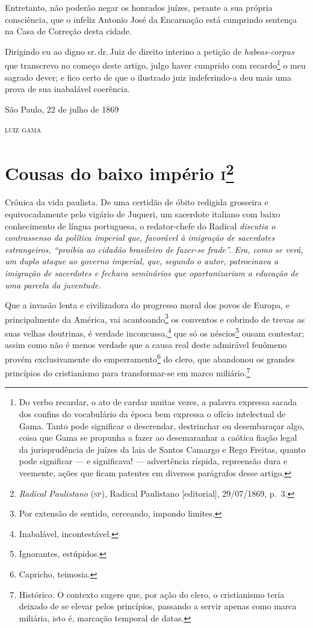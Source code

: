 Entretanto, não poderão negar os honrados juízes, perante a sua própria
consciência, que o infeliz Antonio José da Encarnação está cumprindo
sentença na Casa de Correção desta cidade.

Dirigindo eu ao digno sr.\,dr.\,Juiz de direito interino a petição de
\emph{habeas-corpus} que transcrevo no começo deste artigo, julgo haver
cumprido com recardo\footnote{Do verbo recardar, o ato de cardar
  muitas vezes, a palavra expressa sacada dos confins do vocabulário da
  época bem expressa o ofício intelectual de Gama. Tanto pode significar
  o deserendar, destrinchar ou desembaraçar algo, coisa que Gama se
  propunha a fazer ao desemaranhar a caótica fiação legal da
  jurisprudência de juízes da laia de Santos Camargo e Rego Freitas,
  quanto pode significar --- e significava! --- advertência ríspida,
  repreensão dura e veemente, ações que ficam patentes em diversos
  parágrafos desse artigo.} o meu sagrado dever; e fico certo de que o
ilustrado juiz indeferindo-a deu mais uma prova de sua inabalável
coerência.

\begin{flushright}
São Paulo, 22 de julho de 1869

\textsc{luiz gama}
\end{flushright}

\chapter{Cousas do baixo império \textsc{i}\footnote{\emph{Radical
  Paulistano} (\textsc{sp}), Radical Paulistano {[}editorial{]}, 29/07/1869,
  p.~3.}}

\begin{didascalia}
Crônica da vida paulista. De uma certidão de óbito redigida grosseira e
equivocadamente pelo vigário de Juqueri, um sacerdote italiano com baixo
conhecimento de língua portuguesa, o redator-chefe do Radical
\emph{discutia o contrassenso da política imperial que, favorável à
imigração de sacerdotes estrangeiros, ``proibia ao cidadão
brasileiro de fazer-se frade''. Era, como se verá, um duplo ataque ao
governo imperial, que, segundo o autor, patrocinava a imigração de
sacerdotes e fechava seminários que oportunizariam a educação de uma
parcela da juventude.}
\end{didascalia}



Que a invasão lenta e civilizadora do progresso moral dos povos de
Europa, e principalmente da América, vai acantoando\footnote{Por
  extensão de sentido, cerceando, impondo limites.} os conventos e
cobrindo de trevas as suas velhas doutrinas, é verdade
inconcussa,\footnote{Inabalável, incontestável.} que só os
néscios\footnote{Ignorantes, estúpidos.} ousam contestar; assim como
não é menos verdade que a causa real deste admirável fenômeno provém
exclusivamente do emperramento\footnote{Capricho, teimosia.} do clero,
que abandonou os grandes princípios do cristianismo para transformar-se
em marco miliário.\footnote{Histórico. O contexto sugere que, por ação
  do clero, o cristianismo teria deixado de se elevar pelos princípios,
  passando a servir apenas como marca miliária, isto é, marcação
  temporal de datas.}

